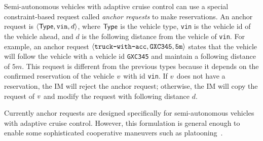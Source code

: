 Semi-autonomous vehicles with adaptive cruise control can use a special
constraint-based request called \emph{anchor requests} to make
reservations. An anchor request is $\langle {\sf Type}, \texttt{vin},
d \rangle$, where ${\sf Type}$ is the vehicle type, \texttt{vin} is
the vehicle id of the vehicle ahead, and $d$ is the following
distance from the vehicle of \texttt{vin}.  For example, an anchor
request $\langle \texttt{truck-with-acc}, \texttt{GXC345}, {\tt 5m}
\rangle$ states that the vehicle will follow the vehicle with a
vehicle id {\tt GXC345} and maintain a following distance of $5m$.
This request is different from the previous types because it depends on the confirmed
reservation of the vehicle $v$ with id \texttt{vin}. If $v$ does not
have a reservation, the IM will reject the anchor request; otherwise,
the IM will copy the request of $v$ and modify the request with 
following distance $d$.

Currently anchor requests are designed specifically for
semi-autonomous vehicles with adaptive cruise control.  However, this
formulation is general enough to enable some sophisticated cooperative
maneuvers such as platooning~\cite{bib:Sheikholeslam90Longitudinal}.












